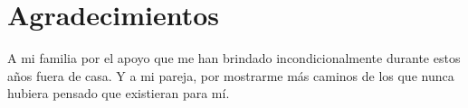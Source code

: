 \chapter*{Agradecimientos} \label{ch:agradecimientos}

A mi familia por el apoyo que me han brindado incondicionalmente durante estos años fuera de casa. Y a mi pareja, por mostrarme más caminos de los que nunca hubiera pensado que existieran para mí.